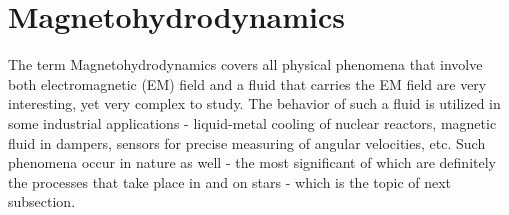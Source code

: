 \section{Magnetohydrodynamics}
The term Magnetohydrodynamics covers all physical phenomena that involve both electromagnetic (EM) field and a fluid that carries the EM field are very interesting, yet very complex to study. The behavior of such a fluid is utilized in some industrial applications - liquid-metal cooling of nuclear reactors, magnetic fluid in dampers, sensors for precise measuring of angular velocities, etc. Such phenomena occur in nature as well - the most significant of which are definitely the processes that take place in and on stars - which is the topic of next subsection.